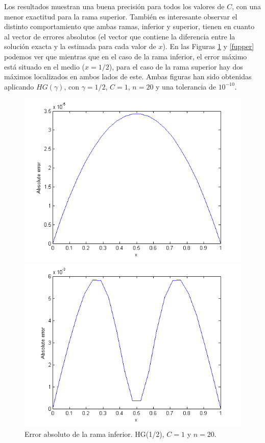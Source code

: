 Los resultados muestran una buena precisión para todos los valores de $C$, con una menor exactitud para la rama superior.
También es interesante observar el distinto comportamiento que ambas ramas, inferior y superior, tienen en cuanto al vector de errores absolutos (el vector que contiene la diferencia entre la solución exacta y la estimada para cada valor de $x$). En las Figuras \ref{flower} y \ref{fupper} podemos ver que mientras que en el caso de la rama inferior, el error máximo está situado en el medio ($x=1/2$), para el caso de la rama superior hay dos máximos localizados en ambos lados de este. Ambas figuras han sido obtenidas aplicando $HG(\gamma)$, con $\gamma=1/2$, $C=1$, $n=20$
y una tolerancia de $10^{-10}$.

\begin{figure}[h!]\centering
	\begin{minipage}[m]{0.38\linewidth}
		\includegraphics[width=1.1\textwidth]{figure_lower.png}
		\caption{Error absoluto de la rama inferior. HG(1/2), $C=1$ y $n=20$.}
		\label{flower}
	\end{minipage}\hspace{2cm}
	\begin{minipage}[m]{0.38\linewidth}
		\includegraphics[width=1.1\textwidth]{figure_upper.png}

\end{minipage}
\end{figure}
